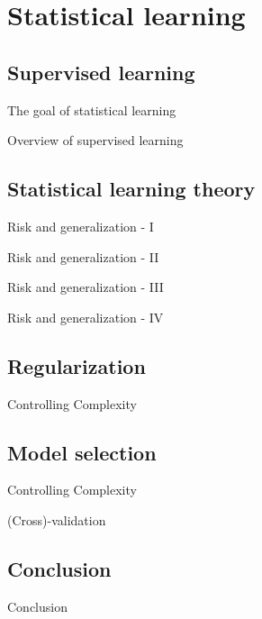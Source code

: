 
\section{Statistical learning}
\subsection{Supervised learning}
\begin{frame}[t]{The goal of statistical learning}

\end{frame}
\begin{frame}[t]{Overview of supervised learning}

\end{frame}
%
\subsection{Statistical learning theory}
\begin{frame}[t]{Risk and generalization - I}

\end{frame}
\begin{frame}[t]{Risk and generalization - II}

\end{frame}
\begin{frame}[t]{Risk and generalization - III}

\end{frame}
\begin{frame}[t]{Risk and generalization - IV}

\end{frame}
\subsection{Regularization}
\begin{frame}[t]{Controlling Complexity}

\end{frame}
%
\subsection{Model selection}
\begin{frame}[t]{Controlling Complexity}

\end{frame}
%
\begin{frame}[t]{(Cross)-validation}

\end{frame}
\subsection{Conclusion}
\begin{frame}[t]{Conclusion}

\end{frame}